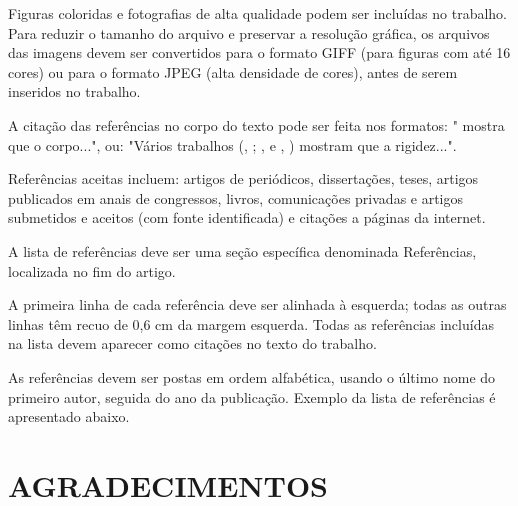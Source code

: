 \documentclass[10pt,fleqn,a4paper]{article}
\begin{document}
        Figuras coloridas e fotografias de alta qualidade podem ser incluídas no trabalho. Para reduzir o tamanho do arquivo e preservar a resolução gráfica, os arquivos das imagens devem ser convertidos para o  formato GIFF (para figuras com até 16 cores) ou para o formato JPEG (alta densidade de cores), antes de serem inseridos no trabalho.

        A citação das referências no corpo do texto pode ser feita nos formatos: "\citet{Bordalo89} mostra que o corpo...", ou: "Vários trabalhos (\citeauthor{Coimbra78}, \citeyear{Coimbra78}; \citeauthor{Clark86}, \citeyear{Clark86} e \citeauthor{Sparrow80},  \citeyear{Sparrow80}) mostram que a rigidez...".

        
        
        Referências aceitas incluem: artigos de periódicos, dissertações, teses, artigos publicados em anais de congressos, livros, comunicações privadas e artigos submetidos e aceitos (com fonte identificada) e citações a páginas da internet.

        A lista de referências deve ser uma seção específica denominada Referências, localizada no fim do artigo.

        A primeira linha de cada referência deve ser alinhada à esquerda; todas as outras linhas têm recuo de 0,6 cm da margem esquerda. Todas as referências incluídas na lista devem aparecer como citações no texto do trabalho.

        As referências devem ser postas em ordem alfabética, usando o último nome do primeiro autor, seguida do ano da publicação. Exemplo da lista de referências é apresentado abaixo.


    \section{AGRADECIMENTOS}
    
\end{document}
